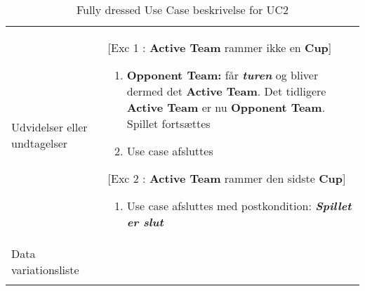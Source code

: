 \documentclass[Kravspecifikation/Kravspec_Main.tex]{subfiles}
\begin{document}
\begin{longtable}[]{@{}ll@{}}
\begin{minipage}[t]{0.47\columnwidth}
\end{minipage}\tabularnewline
\toprule
\begin{minipage}[t]{0.47\columnwidth}\raggedright
{Udvidelser eller undtagelser}\strut
\end{minipage} & \begin{minipage}[t]{0.47\columnwidth}\raggedright
[Exc 1 : \textbf{Active Team} rammer ikke en \textbf{Cup}] 
\begin{enumerate}
\item {\textbf{Opponent Team:} får \textbf{\textit{turen}} og bliver dermed det \textbf{Active Team}. Det tidligere \textbf{Active Team} er nu \textbf{Opponent Team}. Spillet fortsættes}
\item Use case afsluttes
\end{enumerate}
[Exc 2 : \textbf{Active Team} rammer den sidste \textbf{Cup}]
\begin{enumerate}
\item Use case afsluttes med postkondition: \textbf{\textit{Spillet er slut}}
\end{enumerate}\strut
\end{minipage}\tabularnewline
\toprule
\begin{minipage}[t]{0.47\columnwidth}\raggedright
{Data variationsliste}\strut
\end{minipage} & \begin{minipage}[t]{0.47\columnwidth}\raggedright
{}\strut
\end{minipage}\tabularnewline
\bottomrule
\bottomrule
\caption{Fully dressed Use Case beskrivelse for UC2}
\end{longtable}
\label{tab:UC2}
\end{document}
